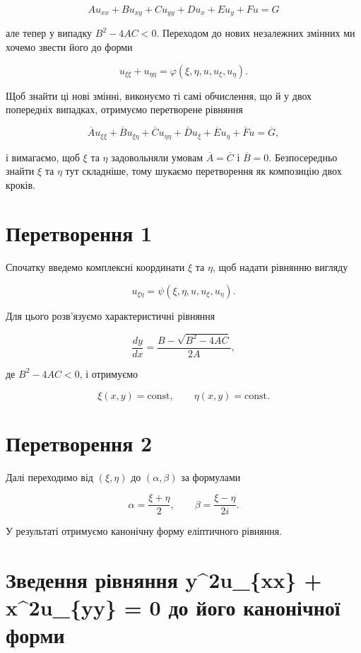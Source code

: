 \documentclass[
  ukrainian,
]{article}
\begin{document}
\[
Au_{xx} + Bu_{xy} + Cu_{yy} + Du_x + Eu_y + Fu = G
\]

але тепер у випадку \(B^2 - 4AC < 0\). Переходом до нових незалежних
змінних ми хочемо звести його до форми

\[
u_{\xi\xi} + u_{\eta\eta} = \varphi(\xi, \eta, u, u_{\xi}, u_{\eta}).
\]

Щоб знайти ці нові змінні, виконуємо ті самі обчислення, що й у двох
попередніх випадках, отримуємо перетворене рівняння

\[
\overline{A}u_{\xi\xi} + \overline{B}u_{\xi\eta} + \overline{C}u_{\eta\eta} + \overline{D}u_{\xi} + \overline{E}u_{\eta} + \overline{F}u = \overline{G},
\]

і вимагаємо, щоб \(\xi\) та \(\eta\) задовольняли умовам
\(\overline{A} = \overline{C}\) і \(\overline{B} = 0\). Безпосередньо
знайти \(\xi\) та \(\eta\) тут складніше, тому шукаємо перетворення як
композицію двох кроків.

\section{Перетворення
1}\label{ux43fux435ux440ux435ux442ux432ux43eux440ux435ux43dux43dux44f-1}

Спочатку введемо комплексні координати \(\xi\) та \(\eta\), щоб надати
рівнянню вигляду

\[
u_{\xi\eta} = \psi(\xi, \eta, u, u_{\xi}, u_{\eta}).
\]

Для цього розв'язуємо характеристичні рівняння

\[
\frac{dy}{dx} = \frac{B - \sqrt{B^2 - 4AC}}{2A},
\]

де \(B^2 - 4AC < 0\), і отримуємо

\[
\xi(x, y) = \text{const}, \qquad \eta(x, y) = \text{const}.
\]

\section{Перетворення
2}\label{ux43fux435ux440ux435ux442ux432ux43eux440ux435ux43dux43dux44f-2}

Далі переходимо від \((\xi,\eta)\) до \((\alpha,\beta)\) за формулами

\[
\alpha = \frac{\xi + \eta}{2}, \qquad \beta = \frac{\xi - \eta}{2i}.
\]

У результаті отримуємо канонічну форму еліптичного рівняння.

\section{Зведення рівняння y\^{}2u\_\{xx\} + x\^{}2u\_\{yy\} = 0 до його
канонічної
форми}\label{ux437ux432ux435ux434ux435ux43dux43dux44f-ux440ux456ux432ux43dux44fux43dux43dux44f-y2u_xx-x2u_yy-0-ux434ux43e-ux439ux43eux433ux43e-ux43aux430ux43dux43eux43dux456ux447ux43dux43eux457-ux444ux43eux440ux43cux438}
\end{document}
